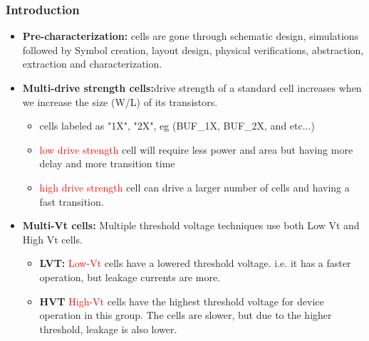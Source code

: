 \documentclass{beamer}
\begin{document}
	
	\begin{frame}
		\frametitle{Introduction}
		\begin{itemize}
		\item \textbf{Pre-characterization:} cells are gone through schematic design, simulations followed by Symbol creation, layout design, physical verifications, abstraction, extraction and characterization. 
		\item \textbf{Multi-drive strength cells:}drive strength of a standard cell increases when we increase the size (W/L) of its transistors.
			\begin{itemize}
				\item cells labeled as "1X", "2X", eg (BUF\_1X, BUF\_2X, and etc...)
				\item \textcolor {red} {low drive strength} cell will require less power and area but having more delay and more transition time
				\item \textcolor {red} {high drive strength} cell can drive a larger number of cells and having a fast transition.
				
			\end{itemize}
		\item \textbf{Multi-Vt cells:} Multiple threshold voltage techniques use both Low Vt and High Vt cells.
		\begin{itemize}
			\item \textbf{LVT:} \textcolor {red} {Low-Vt} cells have a lowered threshold voltage. i.e. it has a faster operation, but leakage currents are more.
			\item \textbf{HVT} \textcolor {red} {High-Vt} cells have the highest threshold voltage for device operation in this group. The cells are slower, but due to the higher threshold, leakage is also lower.
		\end{itemize}
		\end{itemize}	
	\end{frame}
\end{document}
